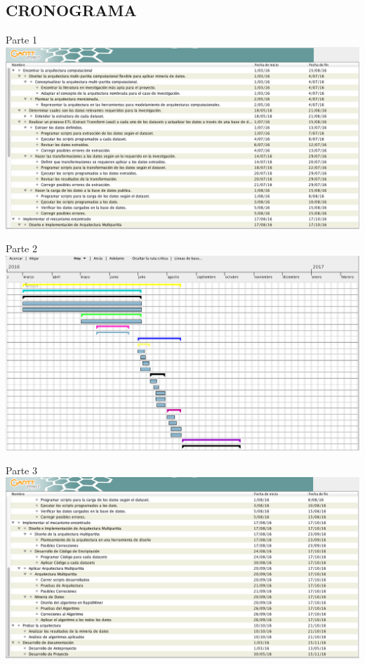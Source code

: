 \documentclass[a4paper, 12pt, oneside]{article}
\theoremstyle{definition}
\theoremstyle{remark}
\begin{document}
\begin{table}
\begin{center}
\section{CRONOGRAMA}
\end{center}
\begin{center}
Parte 1
\includegraphics[width=\textwidth]{Imagen1.png}
\end{center}
\end{table}
\clearpage

\begin{table}
\begin{center}
Parte 2
\includegraphics[width=\textwidth]{Imagen3.png}
\end{center}
\end{table}
\clearpage

\begin{table}
\begin{center}
Parte 3
\includegraphics[width=\textwidth]{Imagen2.png}
\end{center}
\end{table}
\clearpage
\end{document}

